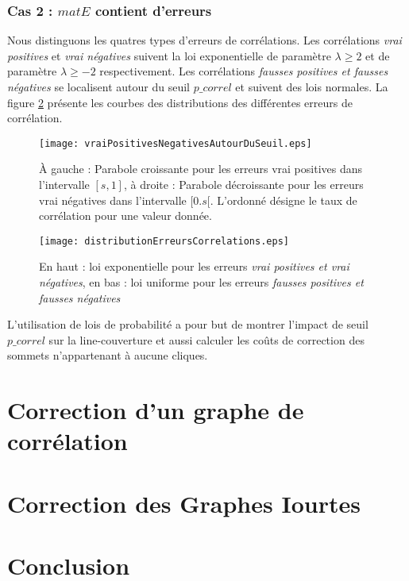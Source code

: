 \documentclass[onecolumn, 12pt]{book}
\begin{document}
\subsubsection{Cas 2 : $matE$ contient d'erreurs }
Nous distinguons les quatres types d'erreurs de corr\'elations. Les corr\'elations {\em vrai positives} et {\em vrai n\'egatives}  suivent  la loi exponentielle de param\`etre $\lambda \ge 2$ et de param\`etre $\lambda \ge -2$ respectivement. 
Les corr\'elations {\em fausses positives et fausses n\'egatives} se localisent autour du seuil $p\_correl$ et  suivent des lois normales. La figure \ref{distributionErreursCorrelations} pr\'esente les courbes des distributions des  diff\'erentes erreurs de corr\'elation.
\begin{figure}[htb!] 
\centering
\texttt{[image: vraiPositivesNegativesAutourDuSeuil.eps]}
\caption{\`A gauche : Parabole croissante pour les erreurs {vrai positives} dans l'intervalle  $[s,1]$, \`a droite : Parabole d\'ecroissante pour les erreurs {vrai n\'egatives} dans l'intervalle $[0.s[$. L'ordonn\'e d\'esigne le taux de corr\'elation pour une valeur donn\'ee. }
\label{vraiPositivesNegativesAutourDuSeuil} 
\end{figure}

\begin{figure}[htb!] 
\centering
\texttt{[image: distributionErreursCorrelations.eps]}
\caption{En haut : loi exponentielle pour les erreurs   {\em vrai positives et vrai n\'egatives}, en bas : loi uniforme pour les erreurs   {\em fausses positives et fausses n\'egatives} }
\label{distributionErreursCorrelations} 
\end{figure}

 
L'utilisation de lois de probabilit\'e a pour but de montrer l'impact de seuil $p\_correl$ sur la line-couverture et aussi calculer les co\^uts de correction des sommets n'appartenant \`a aucune cliques.

\section{Correction d'un graphe de corr\'elation}


\section{Correction des Graphes Iourtes}


\section{Conclusion}
\end{document}
